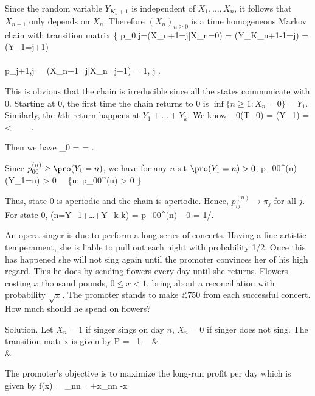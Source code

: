 Since the random variable $Y_{K_n+1}$ is independent of $X_1, \dots, X_n$, it follows that $X_{n+1}$ only depends on $X_n$. Therefore $(X_n)_{n\geq 0}$ is a time homogeneous Markov chain with transition matrix
\be
\left\{
p_{0,j}=\pro(X_{n+1}=j|X_n=0) = \pro(Y_{K_n+1}-1=j) = \pro(Y_1=j+1)\\
\\
p_{j+1,j} = \pro(X_{n+1}=j|X_n=j+1) = 1, \quad \forall j
\ea\right.
\ee

This is obvious that the chain is irreducible since all the states communicate with 0. Starting at 0, the first time the chain returns to 0 is $\inf\{n\geq 1: X_n=0\} = Y_1$. Similarly, the $k$th return happens at $Y_1+\dots+Y_k$. We know
\be
\E_0(T_0) = \E(Y_1) = \mu <\infty \ \ra \  \ \ra\ .
\ee

Then we have
\be
\pi_0 =  = \mu.
\ee

Since $p_{00}^{(n)} \geq \pro(Y_1=n)$, we have for any $n$ s.t $\pro(Y_1=n)>0$,
\be
p_{00}^{(n)} \geq \pro(Y_1=n) > 0 \ \ra \ \{n: p_{00}^{(n)} > 0 \} 
\ee

Thus, state 0 is aperiodic and the chain is aperiodic. Hence, $p_{ij}^{(n)}\to \pi_j$ for all $j$. For state 0,
\be
\pro(n=Y_1+\dots+Y_k k) = p_{00}^{(n)} \to \pi_0 = 1/\mu.
\ee

\begin{exercise}
An opera singer is due to perform a long series of concerts. Having a fine artistic temperament, she is liable to pull out each night with probability 1/2. Once this has happened she will not sing again until the promoter convinces her of his high regard. This he does by sending flowers every day until she returns. Flowers costing $x$ thousand pounds, $0\leq x<1$, bring about a reconciliation with probability $\sqrt{x}$. The promoter stands to make \pounds 750 from each successful concert. How much should he spend on flowers?
\end{exercise}

Solution. Let $X_n=1$ if singer sings on day $n$, $X_n=0$ if singer does not sing. The transition matrix is given by
\be
P =
\lob{}
\ 1-\ \  & \ \ \ \\
 & 
\ea\rob
\ee

The promoter's objective is to maximize the long-run profit per day which is given by
\be
f(x) = \lim_{n\to\infty}\lob {}n\rob = \lob{}+x\rob\lim_{n\to\infty}n -x
\ee

